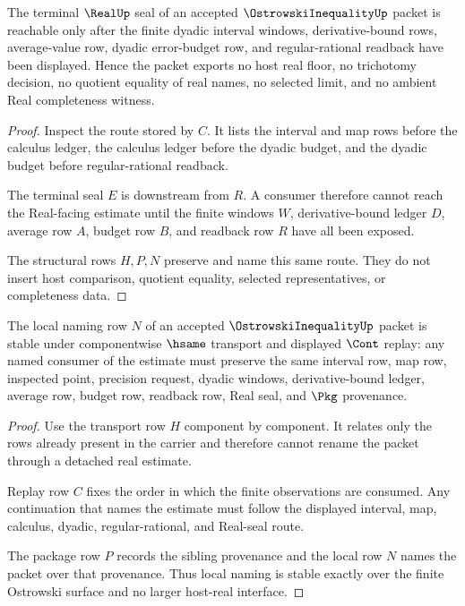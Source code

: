 \begin{theorem}
\label{thm:ostrowski-inequality-real-seal-handoff}
The terminal $\RealUp$ seal of an accepted $\OstrowskiInequalityUp$ packet is reachable only after the finite dyadic interval windows, derivative-bound rows, average-value row, dyadic error-budget row, and regular-rational readback have been displayed. Hence the packet exports no host real floor, no trichotomy decision, no quotient equality of real names, no selected limit, and no ambient Real completeness witness.
\end{theorem}
\begin{proof}
Inspect the route stored by $C$. It lists the interval and map rows before the calculus ledger, the calculus ledger before the dyadic budget, and the dyadic budget before regular-rational readback.

The terminal seal $E$ is downstream from $R$. A consumer therefore cannot reach the Real-facing estimate until the finite windows $W$, derivative-bound ledger $D$, average row $A$, budget row $B$, and readback row $R$ have all been exposed.

The structural rows $H,P,N$ preserve and name this same route. They do not insert host comparison, quotient equality, selected representatives, or completeness data.
\end{proof}

\begin{theorem}
\label{thm:ostrowski-inequality-local-naming-surface}
The local naming row $N$ of an accepted $\OstrowskiInequalityUp$ packet is stable under componentwise $\hsame$ transport and displayed $\Cont$ replay: any named consumer of the estimate must preserve the same interval row, map row, inspected point, precision request, dyadic windows, derivative-bound ledger, average row, budget row, readback row, Real seal, and $\Pkg$ provenance.
\end{theorem}
\begin{proof}
Use the transport row $H$ component by component. It relates only the rows already present in the carrier and therefore cannot rename the packet through a detached real estimate.

Replay row $C$ fixes the order in which the finite observations are consumed. Any continuation that names the estimate must follow the displayed interval, map, calculus, dyadic, regular-rational, and Real-seal route.

The package row $P$ records the sibling provenance and the local row $N$ names the packet over that provenance. Thus local naming is stable exactly over the finite Ostrowski surface and no larger host-real interface.
\end{proof}

